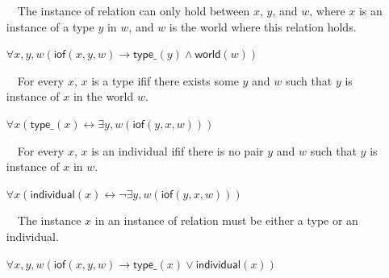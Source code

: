 \documentclass{article}
\newcommand{\AxLabel}{a}
\newcounter{cntax}
\newcommand{\myax}[1]{\refstepcounter{cntax}{\bf \small \AxLabel\thecntax}\label{#1}$\,\,\,\,$}
\newcommand{\me}[1]{\textsf{#1}}
\begin{document}
\begin{itemize}
    \item[\myax{ax_dIof}] The \me{instance of} relation can only hold between $x$, $y$, and $w$, where $x$ is an instance of a type $y$ in $w$, and $w$ is the world where this relation holds.
    
    $\forall x,y,w(\textsf{iof}(x,y,w)\rightarrow \textsf{type\_}(y)\wedge \textsf{world}(w))$

    
    
    \item[\myax{ax_dType}] For every $x$, $x$ is a type ifif there exists some $y$ and $w$ such that $y$ is instance of $x$ in the world $w$.
    
    $\forall x(\textsf{type\_}(x)\leftrightarrow \exists y,w(\textsf{iof}(y,x,w)))$

    
    
    \item[\myax{ax_dIndividual}] For every $x$, $x$ is an individual ifif there is no pair $y$ and $w$ such that $y$ is instance of $x$ in $w$.
    
    $\forall x(\textsf{individual}(x)\leftrightarrow \neg \exists y,w(\textsf{iof}(y,x,w)))$

    
    
    \item[\myax{ax_multiLevel}] The instance $x$ in an instance of relation must be either a type or an individual.
    
    $\forall x,y,w(\textsf{iof}(x,y,w)\rightarrow \textsf{type\_}(x)\vee \textsf{individual}(x))$

    
    

\end{itemize}
\end{document}
